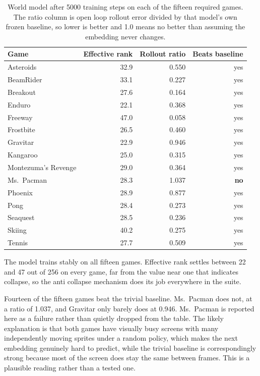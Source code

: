 \documentclass[11pt,a4paper]{article}
\begin{document}
\begin{table}[h]
\centering
\caption{World model after 5000 training steps on each of the fifteen required
games. The ratio column is open loop rollout error divided by that model's own
frozen baseline, so lower is better and 1.0 means no better than assuming the
embedding never changes.}
\label{tab:games}
\begin{tabular}{lrrr}
\toprule
Game & Effective rank & Rollout ratio & Beats baseline \\
\midrule
Asteroids          & 32.9 & 0.550 & yes \\
BeamRider          & 33.1 & 0.227 & yes \\
Breakout           & 27.6 & 0.164 & yes \\
Enduro             & 22.1 & 0.368 & yes \\
Freeway            & 47.0 & 0.058 & yes \\
Frostbite          & 26.5 & 0.460 & yes \\
Gravitar           & 22.9 & 0.946 & yes \\
Kangaroo           & 25.0 & 0.315 & yes \\
Montezuma's Revenge & 29.0 & 0.364 & yes \\
Ms.\ Pacman        & 28.3 & 1.037 & \textbf{no} \\
Phoenix            & 28.9 & 0.877 & yes \\
Pong               & 28.4 & 0.273 & yes \\
Seaquest           & 28.5 & 0.236 & yes \\
Skiing             & 40.2 & 0.275 & yes \\
Tennis             & 27.7 & 0.509 & yes \\
\bottomrule
\end{tabular}
\end{table}

The model trains stably on all fifteen games. Effective rank settles between 22 and
47 out of 256 on every game, far from the value near one that indicates collapse,
so the anti collapse mechanism does its job everywhere in the suite.

Fourteen of the fifteen games beat the trivial baseline. Ms.\ Pacman does not, at a
ratio of 1.037, and Gravitar only barely does at 0.946. Ms.\ Pacman is reported
here as a failure rather than quietly dropped from the table. The likely
explanation is that both games have visually busy screens with many independently
moving sprites under a random policy, which makes the next embedding genuinely hard
to predict, while the trivial baseline is correspondingly strong because most of
the screen does stay the same between frames. This is a plausible reading rather
than a tested one.
\end{document}
